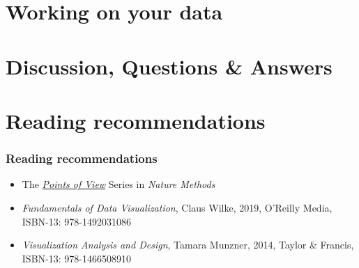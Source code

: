 \documentclass[aspectratio=169]{beamer}
\newcommand{\setfootercentertext}[1]{
\setbeamertemplate{footline}{
  \hspace*{\fill}
  \raisebox{3mm}[0mm][0mm]{
    \tiny{#1}}\hspace*{\fill}}
}
\begin{document}
\section{Working on your data}

\setfootercentertext{}

\begin{frame}{}
  \tableofcontents[currentsection]
\end{frame}


\section{Discussion, Questions \& Answers}

\begin{frame}{}
  \tableofcontents[currentsection]
\end{frame}

\section{Reading recommendations}


\begin{frame}
  \frametitle{Reading recommendations}
  \begin{block}{}  
    \begin{center}
      \begin{itemize}
      \item The
        \href{http://blogs.nature.com/methagora/2013/07/data-visualization-points-of-view.html}{\textit{Points
            of View}} Series in \textit{Nature Methods}
      \item \textit{Fundamentals of Data Visualization}, Claus Wilke,
        2019, O’Reilly Media, ISBN-13: 978-1492031086
      \item \textit{Visualization Analysis and Design}, Tamara
        Munzner, 2014, Taylor \& Francis, ISBN-13: 978-1466508910
      \end{itemize}
    \end{center}
  \end{block}    
\end{frame}
\end{document}

